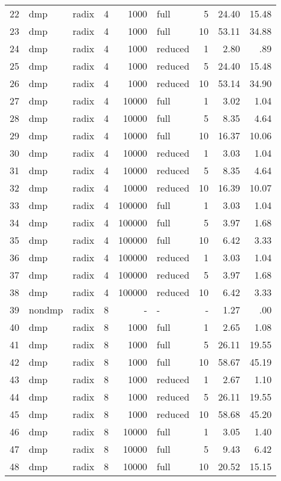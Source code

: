 \begin{center}
\begin{small}
\begin{longtable}{rllrrlrrr}
22 & dmp & radix & 4 & 1000 & full & 5 & 24.40 & 15.48\\
23 & dmp & radix & 4 & 1000 & full & 10 & 53.11 & 34.88\\
24 & dmp & radix & 4 & 1000 & reduced & 1 & 2.80 & .89\\
25 & dmp & radix & 4 & 1000 & reduced & 5 & 24.40 & 15.48\\
26 & dmp & radix & 4 & 1000 & reduced & 10 & 53.14 & 34.90\\
27 & dmp & radix & 4 & 10000 & full & 1 & 3.02 & 1.04\\
28 & dmp & radix & 4 & 10000 & full & 5 & 8.35 & 4.64\\
29 & dmp & radix & 4 & 10000 & full & 10 & 16.37 & 10.06\\
30 & dmp & radix & 4 & 10000 & reduced & 1 & 3.03 & 1.04\\
31 & dmp & radix & 4 & 10000 & reduced & 5 & 8.35 & 4.64\\
32 & dmp & radix & 4 & 10000 & reduced & 10 & 16.39 & 10.07\\
33 & dmp & radix & 4 & 100000 & full & 1 & 3.03 & 1.04\\
34 & dmp & radix & 4 & 100000 & full & 5 & 3.97 & 1.68\\
35 & dmp & radix & 4 & 100000 & full & 10 & 6.42 & 3.33\\
36 & dmp & radix & 4 & 100000 & reduced & 1 & 3.03 & 1.04\\
37 & dmp & radix & 4 & 100000 & reduced & 5 & 3.97 & 1.68\\
38 & dmp & radix & 4 & 100000 & reduced & 10 & 6.42 & 3.33\\
\hline
39 & nondmp & radix & 8 & - & - & - & 1.27 & .00\\
40 & dmp & radix & 8 & 1000 & full & 1 & 2.65 & 1.08\\
41 & dmp & radix & 8 & 1000 & full & 5 & 26.11 & 19.55\\
42 & dmp & radix & 8 & 1000 & full & 10 & 58.67 & 45.19\\
43 & dmp & radix & 8 & 1000 & reduced & 1 & 2.67 & 1.10\\
44 & dmp & radix & 8 & 1000 & reduced & 5 & 26.11 & 19.55\\
45 & dmp & radix & 8 & 1000 & reduced & 10 & 58.68 & 45.20\\
46 & dmp & radix & 8 & 10000 & full & 1 & 3.05 & 1.40\\
47 & dmp & radix & 8 & 10000 & full & 5 & 9.43 & 6.42\\
48 & dmp & radix & 8 & 10000 & full & 10 & 20.52 & 15.15\\

\end{longtable}
\end{small}
\end{center}
